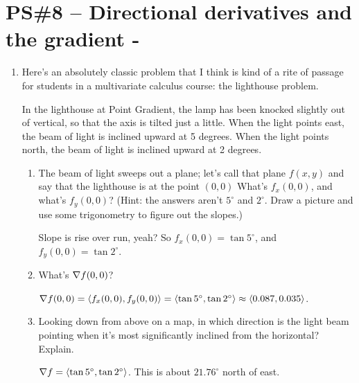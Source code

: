 


%


\allowdisplaybreaks
\section{PS\#8 -- Directional derivatives and the gradient -  }

\begin{enumerate}[leftmargin=0pt]
    
    \item Here's an absolutely classic problem that I think is kind of a rite of passage for students in a multivariate calculus course: the lighthouse problem.
    
    In the lighthouse at Point Gradient, the lamp has been knocked slightly out of vertical, so that the axis is tilted just a little. When the light points east, the beam of light is inclined upward at 5 degrees. When the light points north, the beam of light is inclined upward at 2 degrees.
    
    \begin{enumerate}
        \item The beam of light sweeps out a plane; let's call that plane $f(x, y)$ and say that the lighthouse is at the point $(0, 0)$ What's $f_x(0, 0)$, and what's $f_y(0, 0)$? (Hint: the answers aren't $5^\circ$ and $2^\circ$. Draw a picture and use some trigonometry to figure out the slopes.)
        
        \begin{red}
        Slope is rise over run, yeah? So $f_x(0, 0) = \tan 5^\circ$, and  $f_y(0, 0) = \tan 2^\circ$.
        \end{red}
        \item What's $\nabla f(0, 0)$? 
        
        \begin{red}
        $\nabla f(0, 0) = \langle f_x(0, 0), f_y(0, 0) \rangle = \langle \tan 5^\circ, \tan 2^\circ\rangle \approx \langle 0.087, 0.035\rangle$. 
        \end{red}
        \item Looking down from above on a map, in which direction is the light beam pointing when it's most significantly inclined from the horizontal? Explain. 
        
        \begin{red} $\nabla f = \langle \tan 5^\circ, \tan 2^\circ\rangle$. This is about $21.76^\circ$ north of east.
        

\end{red}
\end{enumerate}
\end{enumerate}
